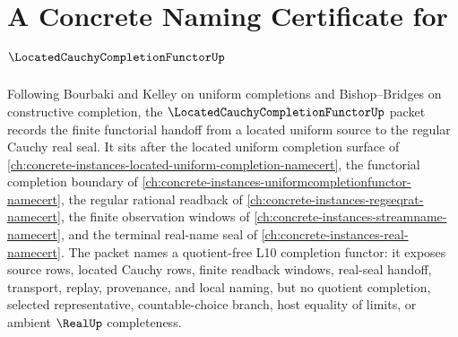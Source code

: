 \chapter{A Concrete Naming Certificate for $\LocatedCauchyCompletionFunctorUp$}
\label{ch:concrete-instances-located-cauchy-completion-functor-namecert}

Following Bourbaki and Kelley on uniform completions and Bishop--Bridges on constructive completion, the $\LocatedCauchyCompletionFunctorUp$ packet records the finite functorial handoff from a located uniform source to the regular Cauchy real seal. It sits after the located uniform completion surface of \autoref{ch:concrete-instances-located-uniform-completion-namecert}, the functorial completion boundary of \autoref{ch:concrete-instances-uniformcompletionfunctor-namecert}, the regular rational readback of \autoref{ch:concrete-instances-regseqrat-namecert}, the finite observation windows of \autoref{ch:concrete-instances-streamname-namecert}, and the terminal real-name seal of \autoref{ch:concrete-instances-real-namecert}. The packet names a quotient-free L10 completion functor: it exposes source rows, located Cauchy rows, finite readback windows, real-seal handoff, transport, replay, provenance, and local naming, but no quotient completion, selected representative, countable-choice branch, host equality of limits, or ambient $\RealUp$ completeness.

